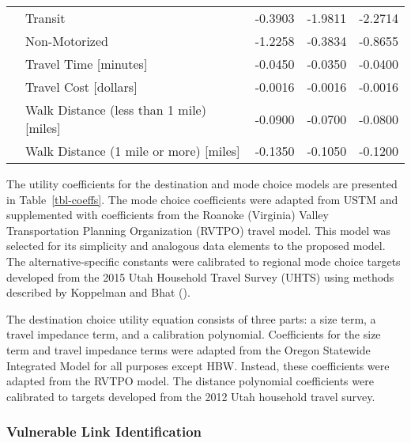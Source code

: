 \documentclass[]{ascelike-new}
\begin{document}
\begin{table}
{\begin{tabular}[t]{llrrr}
\hspace{1em} & Transit & -0.3903 & -1.9811 & -2.2714\\

\hspace{1em} & Non-Motorized & -1.2258 & -0.3834 & -0.8655\\

\hspace{1em} & Travel Time [minutes] & -0.0450 & -0.0350 & -0.0400\\

\hspace{1em} & Travel Cost [dollars] & -0.0016 & -0.0016 & -0.0016\\

\hspace{1em} & Walk Distance (less than 1 mile) [miles] & -0.0900 & -0.0700 & -0.0800\\

\hspace{1em} & Walk Distance (1 mile or more) [miles] & -0.1350 & -0.1050 & -0.1200\\
\bottomrule
\end{tabular}

}

\end{table}%

The utility coefficients for the destination and mode choice models are
presented in Table~\ref{tbl-coeffs}. The mode choice coefficients were
adapted from USTM and supplemented with coefficients from the Roanoke
(Virginia) Valley Transportation Planning Organization (RVTPO) travel
model. This model was selected for its simplicity and analogous data
elements to the proposed model. The alternative-specific constants were
calibrated to regional mode choice targets developed from the 2015 Utah
Household Travel Survey (UHTS) using methods described by Koppelman and
Bhat ().

The destination choice utility equation consists of three parts: a size
term, a travel impedance term, and a calibration polynomial.
Coefficients for the size term and travel impedance terms were adapted
from the Oregon Statewide Integrated Model for all purposes except HBW.
Instead, these coefficients were adapted from the RVTPO model. The
distance polynomial coefficients were calibrated to targets developed
from the 2012 Utah household travel survey.

\subsubsection{Vulnerable Link
Identification}\label{vulnerable-link-identification}
\end{document}
